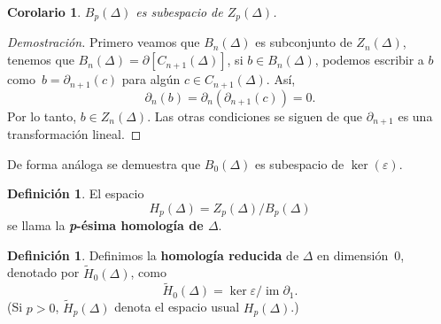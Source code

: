 \documentclass[12pt]{book}
\newtheorem{corollary}[theorem]{Corolario}
\theoremstyle{definition}
\newtheorem{definition}[theorem]{Definición}
\DeclareMathOperator{\im}{im}
\newcounter{in}
\newcounter{ini}
\begin{document}
\begin{corollary}
  $B_{p}(\Delta)$ es subespacio de $Z_{p}(\Delta)$.
\end{corollary}
\begin{proof}[Demostración]
  Primero veamos que $B_{n}(\Delta)$ es subconjunto de
  $Z_{n}(\Delta)$, tenemos que
  $B_{n}(\Delta)=\partial[C_{n+1}(\Delta)]$, si $b\in B_{n}(\Delta)$,
  podemos escribir a $b$ como~$b=\partial_{n+1}(c)$ para algún $c\in
  C_{n+1}(\Delta)$. Así,
$$\partial_{n}(b)=\partial_{n}(\partial_{n+1}(c))=0.$$
Por lo tanto, $b\in Z_{n}(\Delta)$.  Las otras condiciones se siguen
de que $\partial_{n+1}$ es una transformación lineal.
\end{proof}
De forma análoga se demuestra que $B_{0}(\Delta)$ es subespacio de $\ker(\varepsilon)$.
\begin{definition}
   El espacio
   $$H_{p}(\Delta)=Z_{p}(\Delta)/B_{p}(\Delta)$$
   se llama la \textbf{\emph{p}-ésima homología de $\Delta$}.
\end{definition}

\begin{definition}
  Definimos la \textbf{homología reducida} de $\Delta$ en
  dimensión~$0$, denotado por $\widetilde H_{0}(\Delta)$, como
  \begin{equation*}
    \widetilde H_{0}(\Delta)=\ker\varepsilon/\im \partial_{1}.
  \end{equation*}
  (Si $p>0$, $\widetilde H_{p}(\Delta)$ denota el espacio usual
  $H_{p}(\Delta)$.)
\end{definition}
\end{document}
